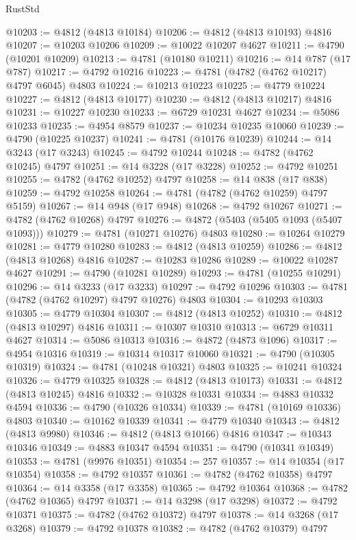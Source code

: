 \begin{lexlean}{RustStd}
\begin{coremodule}
@10203 := @4812 (@4813 @10184)
@10206 := @4812 (@4813 @10193) @4816
@10207 := @10203 @10206
@10209 := @10022 @10207 @4627
@10211 := @4790 (@10201 @10209)
@10213 := @4781 (@10180 @10211)
@10216 := @14 @787 (@17 @787)
@10217 := @4792 @10216
@10223 := @4781 (@4782 (@4762 @10217) @4797 @6045) @4803
@10224 := @10213 @10223
@10225 := @4779 @10224
@10227 := @4812 (@4813 @10177)
@10230 := @4812 (@4813 @10217) @4816
@10231 := @10227 @10230
@10233 := @6729 @10231 @4627
@10234 := @5086 @10233
@10235 := @4954 @8579
@10237 := @10234 @10235 @10060
@10239 := @4790 (@10225 @10237)
@10241 := @4781 (@10176 @10239)
@10244 := @14 @3243 (@17 @3243)
@10245 := @4792 @10244
@10248 := @4782 (@4762 @10245) @4797
@10251 := @14 @3228 (@17 @3228)
@10252 := @4792 @10251
@10255 := @4782 (@4762 @10252) @4797
@10258 := @14 @838 (@17 @838)
@10259 := @4792 @10258
@10264 := @4781 (@4782 (@4762 @10259) @4797 @5159)
@10267 := @14 @948 (@17 @948)
@10268 := @4792 @10267
@10271 := @4782 (@4762 @10268) @4797
@10276 := @4872 (@5403 (@5405 @1093 (@5407 @1093)))
@10279 := @4781 (@10271 @10276) @4803
@10280 := @10264 @10279
@10281 := @4779 @10280
@10283 := @4812 (@4813 @10259)
@10286 := @4812 (@4813 @10268) @4816
@10287 := @10283 @10286
@10289 := @10022 @10287 @4627
@10291 := @4790 (@10281 @10289)
@10293 := @4781 (@10255 @10291)
@10296 := @14 @3233 (@17 @3233)
@10297 := @4792 @10296
@10303 := @4781 (@4782 (@4762 @10297) @4797 @10276) @4803
@10304 := @10293 @10303
@10305 := @4779 @10304
@10307 := @4812 (@4813 @10252)
@10310 := @4812 (@4813 @10297) @4816
@10311 := @10307 @10310
@10313 := @6729 @10311 @4627
@10314 := @5086 @10313
@10316 := @4872 (@4873 @1096)
@10317 := @4954 @10316
@10319 := @10314 @10317 @10060
@10321 := @4790 (@10305 @10319)
@10324 := @4781 (@10248 @10321) @4803
@10325 := @10241 @10324
@10326 := @4779 @10325
@10328 := @4812 (@4813 @10173)
@10331 := @4812 (@4813 @10245) @4816
@10332 := @10328 @10331
@10334 := @4883 @10332 @4594
@10336 := @4790 (@10326 @10334)
@10339 := @4781 (@10169 @10336) @4803
@10340 := @10162 @10339
@10341 := @4779 @10340
@10343 := @4812 (@4813 @9980)
@10346 := @4812 (@4813 @10166) @4816
@10347 := @10343 @10346
@10349 := @4883 @10347 @4594
@10351 := @4790 (@10341 @10349)
@10353 := @4781 (@9976 @10351)
@10354 := 257
@10357 := @14 @10354 (@17 @10354)
@10358 := @4792 @10357
@10361 := @4782 (@4762 @10358) @4797
@10364 := @14 @3358 (@17 @3358)
@10365 := @4792 @10364
@10368 := @4782 (@4762 @10365) @4797
@10371 := @14 @3298 (@17 @3298)
@10372 := @4792 @10371
@10375 := @4782 (@4762 @10372) @4797
@10378 := @14 @3268 (@17 @3268)
@10379 := @4792 @10378
@10382 := @4782 (@4762 @10379) @4797

\end{coremodule}
\end{lexlean}
